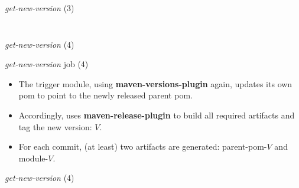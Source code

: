 \documentclass[presentation]{beamer}
\begin{document}
{
\begin{frame}[label=sec-3-6]{\textit{get-new-version} (3)}

\begin{columns}
\begin{column}{0.6\textwidth}
\begin{quotation} %

\end{quotation}
\end{column}
\end{columns}
\end{frame}} %


{
\begin{frame}[label=sec-3-7]{\textit{get-new-version} (4)}

\begin{block}{\textit{get-new-version} job (4)}

\begin{itemize}
\item The trigger module, using \textbf{maven-versions-plugin} again, updates its own pom to point to the newly released parent pom.
\item Accordingly, uses \textbf{maven-release-plugin} to build all required artifacts and tag the new version: $V$.
\item For each commit, (at least) two artifacts are generated: parent-pom-$V$ and module-$V$.
\end{itemize}
\end{block}
\end{frame}} %


{
\begin{frame}[label=sec-3-8]{\textit{get-new-version} (4)}

\begin{columns}
\begin{column}{0.6\textwidth}
\begin{quotation} %

\end{quotation}
\end{column}
\end{columns}
\end{frame}} %
\end{document}
